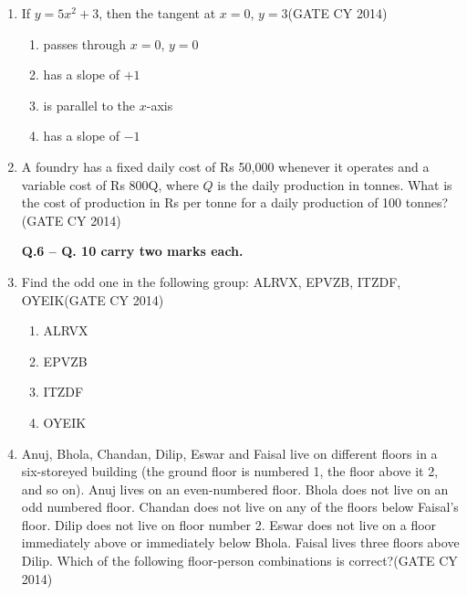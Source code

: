 \documentclass[a4paper,10pt]{exam}
\theoremstyle{remark}
\begin{document}
\begin{enumerate}
    \item If $y=5x^2+3$, then the tangent at $x=0$, $y=3$\hfill{(GATE CY 2014)}
    \begin{multicols}{2}
    \begin{enumerate}
        \item passes through $x = 0$, $y = 0$
        \item has a slope of $+1$
        \item is parallel to the $x$-axis
        \item has a slope of $-1$
    \end{enumerate}
    \end{multicols}

    \item A foundry has a fixed daily cost of Rs 50,000 whenever it operates and a variable cost of Rs 800Q, where $Q$ is the daily production in tonnes. What is the cost of production in Rs per tonne for a daily production of 100 tonnes?\hfill{(GATE CY 2014)}


\vspace{1em}
\textbf{Q.6 -- Q. 10 carry two marks each.}
\vspace{1em}

    \item Find the odd one in the following group: ALRVX, EPVZB, ITZDF, OYEIK\hfill{(GATE CY 2014)}

    \begin{multicols}{4}
    \begin{enumerate}
        \item ALRVX
        \item EPVZB
        \item ITZDF
        \item OYEIK
    \end{enumerate}
    \end{multicols}

    \item Anuj, Bhola, Chandan, Dilip, Eswar and Faisal live on different floors in a six-storeyed building (the ground floor is numbered 1, the floor above it 2, and so on). Anuj lives on an even-numbered floor. Bhola does not live on an odd numbered floor. Chandan does not live on any of the floors below Faisal’s floor. Dilip does not live on floor number 2. Eswar does not live on a floor immediately above or immediately below Bhola. Faisal lives three floors above Dilip. Which of the following floor-person combinations is correct?\hfill{(GATE CY 2014)}


\end{enumerate}
\end{document}
